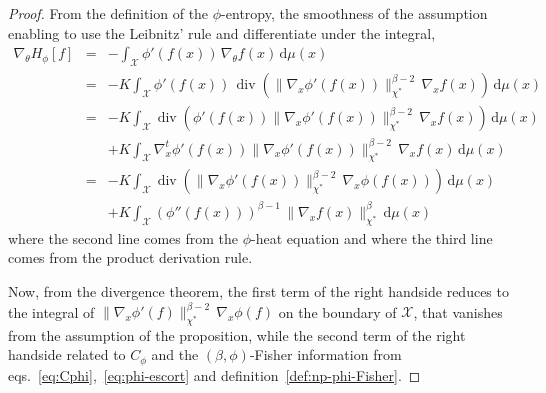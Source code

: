 \documentclass[entropy,article,submit,moreauthors,pdftex]{Definitions/mdpi}
\def\dmu{\mathrm{d}\mu}%
\def\X{\mathcal{X}}%
\def\div{\operatorname{div}}%
\begin{document}
\begin{proof}
  From the  definition of the  $\phi$-entropy, the smoothness of  the assumption
  enabling to use the Leibnitz' rule and differentiate under the integral,
  \begin{eqnarray*}
  \displaystyle \nabla_\theta H_\phi[f] & = & \displaystyle - \int_\X
  \phi'(f(x)) \, \nabla_\theta f(x) \, \dmu(x)
  \\[2.5mm]
  & = & \displaystyle - K \int_\X \phi'(f(x)) \, \div\left( \| \nabla_x
  \phi'(f(x)) \|_{\chi^*}^{\beta-2} \, \nabla_x f(x) \right) \, \dmu(x)
  \\[2.5mm]
  & = & \displaystyle - K \int_\X \div\left( \phi'(f(x)) \| \nabla_x \phi'(f(x))
  \|_{\chi^*}^{\beta-2} \, \nabla_x f(x) \right) \, \dmu(x)
  \\[2.5mm]
  & & \displaystyle + K \int_\X \nabla_x^t
  \phi'(f(x)) \| \nabla_x \phi'(f(x)) \|_{\chi^*}^{\beta-2} \, \nabla_x f(x) \,
  \dmu(x)
  \\[2.5mm]
  & = & \displaystyle - K \int_\X \div\left( \| \nabla_x \phi'(f(x))
  \|_{\chi^*}^{\beta-2} \, \nabla_x \phi(f(x)) \right) \, \dmu(x)
  \\[2.5mm]
  & & \displaystyle  + K \int_\X
  \left( \phi''(f(x)) \right)^{\beta-1} \, \| \nabla_x f(x) \|_{\chi^*}^\beta \,
  \dmu(x)
  \end{eqnarray*}
  where the second line comes from  the $\phi$-heat equation and where the third
  line comes from the product derivation rule.

  Now, from the divergence theorem, the first term of the right handside reduces
  to the  integral of  $\| \nabla_x  \phi'(f) \|_{\chi^*}^{\beta-2}  \, \nabla_x
  \phi(f)$ on  the boundary of  $\X$, that vanishes  from the assumption  of the
  proposition, while the  second term of the right handside  related to $C_\phi$
  and         the         $(\beta,\phi)$-Fisher         information         from
  eqs.~\eqref{eq:Cphi},~\eqref{eq:phi-escort}                                and
  definition~\ref{def:np-phi-Fisher}.
\end{proof}
\end{document}
